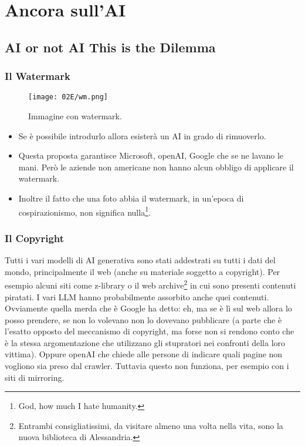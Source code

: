 \chapter{Ancora sull'AI}

\section{AI or not AI This is the Dilemma}

\subsection{Il Watermark}


\begin{figure}[H]
    \centering
    \texttt{[image: 02E/wm.png]}
    \caption{Immagine con watermark.}
\end{figure}



\begin{itemize}
  \item Se è possibile introdurlo allora esisterà un AI in grado di rimuoverlo. 
  \item Questa proposta garantisce Microsoft, openAI, Google che se ne lavano le mani. Però le aziende non americane non hanno alcun obbligo di applicare il watermark.
  \item Inoltre il fatto che una foto abbia il watermark, in un'epoca di cospirazionismo, non significa nulla\footnote{God, how much I hate humanity.}.
\end{itemize}

\subsection{Il Copyright}

Tutti i vari modelli di AI generativa sono stati addestrati su tutti i dati del mondo, principalmente il web (anche su materiale soggetto a copyright). Per esempio alcuni siti come z-library o il web archive\footnote{Entrambi consigliatissimi, da visitare almeno una volta nella vita, sono la nuova biblioteca di Alessandria.} in cui sono presenti contenuti piratati. I vari LLM hanno probabilmente assorbito anche quei contenuti. Ovviamente quella merda che è Google ha detto: eh, ma se è lì sul web allora lo posso prendere, se non lo volevano non lo dovevano pubblicare (a parte che è l'esatto opposto del meccanismo di copyright, ma forse non si rendono conto che è la stessa argomentazione che utilizzano gli stupratori nei confronti della loro vittima). Oppure openAI che chiede alle persone di indicare quali pagine non vogliono sia preso dal crawler. Tuttavia questo non funziona, per esempio con i siti di mirroring.

